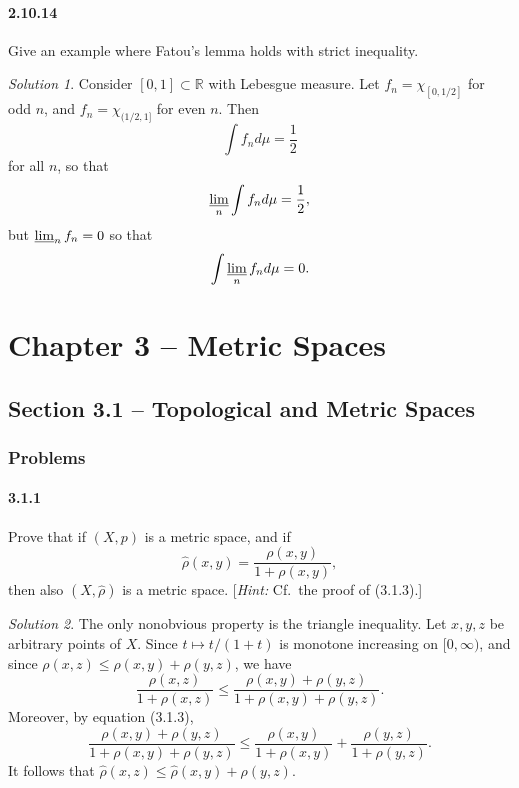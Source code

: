 \documentclass{report}
\newcommand{\bb}[1]{\mathbb{#1}}
\theoremstyle{remark}
\newtheorem*{solution}{Solution}
\begin{document}
\subsubsection*{2.10.14}
Give an example where Fatou's lemma holds with strict inequality.

\begin{solution}
  Consider $[0,1] \subset \bb R$ with Lebesgue measure. Let $f_n = \chi_{[0,1/2]}$ for odd $n$, and $f_n = \chi_{(1/2,1]}$ for even $n$. Then
  \begin{equation*}
    \int f_n d\mu = \frac{1}{2}
  \end{equation*}
  for all $n$, so that
  \begin{equation*}
    \varliminf_n \int f_n d\mu = \frac{1}{2},
  \end{equation*}
  but $\varliminf_n f_n = 0$ so that
  \begin{equation*}
    \int \varliminf_n f_n d\mu = 0.
  \end{equation*}
\end{solution}

\chapter*{Chapter 3 -- Metric Spaces}

\section*{Section 3.1 -- Topological and Metric Spaces}

\subsection*{Problems}

\subsubsection*{3.1.1}
Prove that if $(X,p)$ is a metric space, and if
\begin{equation*}
  \hat \rho(x,y) = \frac{\rho(x,y)}{1 + \rho(x,y)},
\end{equation*}
then also $(X,\hat \rho)$ is a metric space. [\emph{Hint:} Cf.\ the proof of (3.1.3).]

\begin{solution}
  The only nonobvious property is the triangle inequality. Let $x,y,z$ be arbitrary points of $X$. Since $t \mapsto t/(1+t)$ is monotone increasing on $[0,\infty)$, and since $\rho(x,z) \le \rho(x,y) + \rho(y,z)$, we have
  \begin{equation*}
    \frac{\rho(x,z)}{1 + \rho(x,z)} \le \frac{\rho(x,y) + \rho(y,z)}{1 + \rho(x,y) + \rho(y,z)}.
  \end{equation*}
  Moreover, by equation (3.1.3),
  \begin{equation*}
    \frac{\rho(x,y) + \rho(y,z)}{1 + \rho(x,y) + \rho(y,z)} \le \frac{\rho(x,y)}{1 + \rho(x,y)} + \frac{\rho(y,z)}{1 + \rho(y,z)}.
  \end{equation*}
  It follows that $\hat \rho(x,z) \le \hat \rho(x,y) + \rho(y,z)$.
\end{solution}
\end{document}
